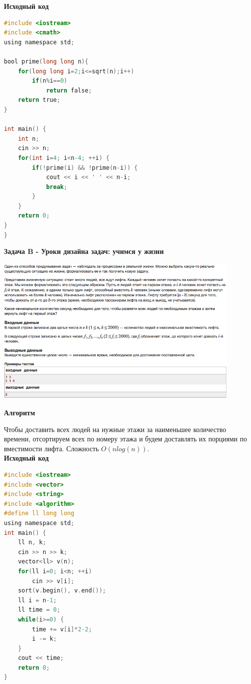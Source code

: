 \documentclass[a4paper,12pt]{article}
\begin{document}
\textbf{{\large Исходный код}} \\
\begin{lstlisting}[language=C]
#include <iostream>
#include <cmath>
using namespace std;

bool prime(long long n){
    for(long long i=2;i<=sqrt(n);i++)
        if(n%i==0)
            return false;
    return true;
}

int main() {
    int n;
    cin >> n;
    for(int i=4; i<n-4; ++i) {
        if(!prime(i) && !prime(n-i)) {
            cout << i << ' ' << n-i;
            break;
        }
    }
    return 0;
}
}\end{lstlisting}

\newpage
\textbf{{\large Задача B - Уроки дизайна задач: учимся у жизни}} \\
\begin{center}
\includegraphics[width=0.9\textwidth]{C_270/C_270_B.png}\\ [1cm]
\end{center}

\textbf{{\large Алгоритм}}

Чтобы доставить всех людей на нужные этажи за наименьшее количество времени, отсортируем всех по номеру этажа и будем доставлять их порциями по вместимости лифта. Сложность $O(nlog(n))$.\\

\textbf{{\large Исходный код}} \\
\begin{lstlisting}[language=C]
#include <iostream>
#include <vector>
#include <string>
#include <algorithm>
#define ll long long
using namespace std;
int main() {
    ll n, k;
    cin >> n >> k;
    vector<ll> v(n);
    for(ll i=0; i<n; ++i)
        cin >> v[i];
    sort(v.begin(), v.end());
    ll i = n-1;
    ll time = 0;
    while(i>=0) {
        time += v[i]*2-2;
        i -= k;
    }
    cout << time;
    return 0;
}
\end{lstlisting}
\end{document}
